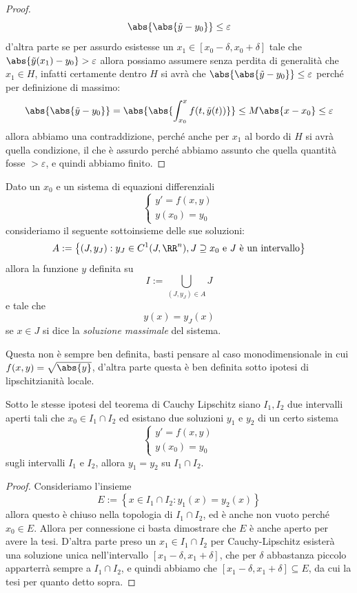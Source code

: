 \documentclass[11pt]{scrartcl}
\begin{document}
\begin{proof}
		$$\abs{\abs{\tilde{y}-y_0}}\le \varepsilon$$
		d'altra parte se per assurdo esistesse un $x_1\in [x_0-\delta,x_0+\delta]$ tale che $\abs{\tilde{y}(x_1)-y_0}>\varepsilon$ allora possiamo assumere senza perdita di generalità che $x_1\in H$, infatti certamente dentro $H$ si avrà che $\abs{\abs{\tilde{y}-y_0}}\le \varepsilon$ perché per definizione di massimo:
		$$\abs{\abs{\tilde{y}-y_0}}=\abs{\abs{\int_{x_0}^x f(t,\tilde{y}(t))}}\le M\abs{x-x_0}\le \varepsilon$$
		allora abbiamo una contraddizione, perché anche per $x_1$ al bordo di $H$ si avrà quella condizione, il che è assurdo perché abbiamo assunto che quella quantità fosse $>\varepsilon$, e quindi abbiamo finito.
	\end{proof}
	\begin{definition}
		Dato un $x_0$ e un sistema di equazioni differenziali
		$$
		\begin{cases}
			y'=f(x,y) \\
			y(x_0)=y_0
		\end{cases}
		$$
		consideriamo il seguente sottoinsieme delle sue soluzioni:
		$$A:=\left\{(J,y_J):y_J\in C^1(J,\RR^n),J\supseteq x_0 \text{ e $J$ è un intervallo}\right\}$$
		allora la funzione $y$ definita su
		$$I:=\bigcup_{(J,y_J)\in A} J$$
		e tale che 
		$$y(x)=y_J(x)$$
		se $x\in J$ si dice la \textit{soluzione massimale} del sistema.
	\end{definition}
 	Questa non è sempre ben definita, basti pensare al caso monodimensionale in cui $f(x,y)=\sqrt{\abs{y}}$, d'altra parte questa è ben definita sotto ipotesi di lipschitzianità locale.
 	\begin{proposition}
 		Sotto le stesse ipotesi del teorema di Cauchy Lipschitz siano $I_1,I_2$ due intervalli aperti tali che $x_0\in I_1\cap I_2$ ed esistano due soluzioni $y_1$ e $y_2$ di un certo sistema
 		$$
 		\begin{cases}
 			y'=f(x,y) \\
 			y(x_0)=y_0
 		\end{cases}
 		$$
 		sugli intervalli $I_1$ e $I_2$, allora $y_1=y_2$ su $I_1\cap I_2$.
 	\end{proposition}
 	\begin{proof}
 		Consideriamo l'insieme 
 		$$E:=\left\{x\in I_1\cap I_2:y_1(x)=y_2(x)\right\}$$
 		allora questo è chiuso nella topologia di $I_1\cap I_2$, ed è anche non vuoto perché $x_0\in E$. Allora per connessione ci basta dimostrare che $E$ è anche aperto per avere la tesi. D'altra parte preso un $x_1\in I_1\cap I_2$ per Cauchy-Lipschitz esisterà una soluzione unica nell'intervallo $[x_1-\delta,x_1+\delta]$, che per $\delta$ abbastanza piccolo apparterrà sempre a $I_1\cap I_2$, e quindi abbiamo che $[x_1-\delta,x_1+\delta]\subseteq E$, da cui la tesi per quanto detto sopra.
 	\end{proof}
\end{document}
